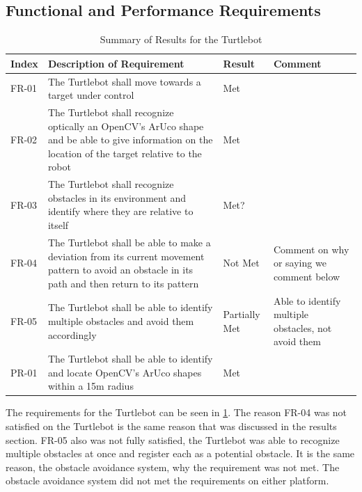 \documentclass{article}
\begin{document}
    \subsection{Functional and Performance Requirements}

	\begin{table}
	    \small
		\begin{tabular}{p{2cm} p{8cm} p{2cm} p{3cm}} 
			\hline
			{\textbf{Index}} & {\textbf{Description of Requirement}} & {\textbf{Result}} & {\textbf{Comment}} \\ \hline
FR-01 & The Turtlebot shall move towards a target under control & Met \\
FR-02 & The Turtlebot shall recognize optically an OpenCV's ArUco shape and be able to give information on the location of the target relative to the robot & Met \\
FR-03 & The Turtlebot shall recognize obstacles in its environment and identify where they are relative to itself & Met? \\
FR-04 & The Turtlebot shall be able to make a deviation from its current movement pattern to avoid an obstacle in its path and then return to its pattern & Not Met & Comment on why or saying we comment below \\
FR-05 & The Turtlebot shall be able to identify multiple obstacles and avoid them accordingly & Partially Met & Able to identify multiple obstacles, not avoid them \\
PR-01 & The Turtlebot shall be able to identify and locate OpenCV's ArUco shapes within a 15m radius & Met \\ \hline
        \end{tabular}
        \caption{Summary of Results for the Turtlebot}
        \label{table:turtlbotresults}
    \end{table}

    The requirements for the Turtlebot can be seen in \ref{table:turtlbotresults}. The reason FR-04 was not satisfied on the Turtlebot is the same reason that was discussed in the results section. FR-05 also was not fully satisfied, the Turtlebot was able to recognize multiple obstacles at once and register each as a potential obstacle. It is the same reason, the obstacle avoidance system, why the requirement was not met. 
    The obstacle avoidance system did not met the requirements on either platform.  
    
\end{document}
